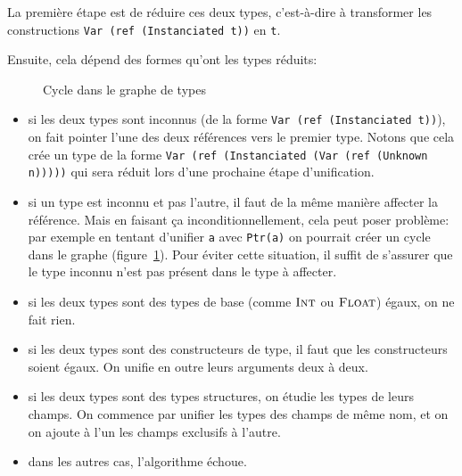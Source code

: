 La première étape est de réduire ces deux types, c'est-à-dire à transformer les
constructions \texttt{Var (ref (Instanciated t))} en \texttt{t}.

Ensuite, cela dépend des formes qu'ont les types réduits:

\begin{figure}
  \centering
  \caption{Cycle dans le graphe de types}
\label{fig:typecycle}
\end{figure}

\begin{itemize}

\item si les deux types sont inconnus (de la forme \texttt{Var (ref
(Instanciated t))}), on fait pointer l'une des deux références vers le premier
type. Notons que cela crée un type de la forme \texttt{Var (ref (Instanciated
(Var (ref (Unknown n)))))} qui sera réduit lors d'une prochaine étape
d'unification.

\item si un type est inconnu et pas l'autre, il faut de la même manière affecter la
référence. Mais en faisant ça inconditionnellement, cela peut poser problème:
par exemple en tentant d'unifier \texttt{a} avec \verb!Ptr(a)! on pourrait
créer un cycle dans le graphe (figure~\ref{fig:typecycle}).
Pour éviter cette situation, il suffit de s'assurer que le type inconnu n'est
pas présent dans le type à affecter.

\item si les deux types sont des types de base (comme $\textsc{Int}$ ou $\textsc{Float}$)
égaux, on ne fait rien.

\item si les deux types sont des constructeurs de type, il faut que les
constructeurs soient égaux. On unifie en outre leurs arguments deux à deux.

\item si les deux types sont des types structures, on étudie les types de leurs
champs. On commence par unifier les types des champs de même nom, et on
on ajoute à l'un les champs exclusifs à l'autre.

\item dans les autres cas, l'algorithme échoue.

\end{itemize}

